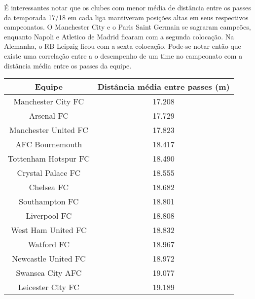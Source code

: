 \documentclass{article}
\begin{document}
É interessantes notar que os clubes com menor média de distância entre os passes da temporada 17/18 em cada liga mantiveram posições altas em seus respectivos campeonatos. O Manchester City e o Paris Saint Germain se sagraram campeões, enquanto Napoli e Atletico de Madrid ficaram com a segunda colocação.
Na Alemanha, o RB Leipzig ficou com a sexta colocação. Pode-se notar então que existe uma correlação entre a o desempenho de um time no campeonato com a distância média entre os passes da equipe.

\begin{table}[H]
    \centering
    \begin{tabular}{|c|c|}
        \hline
        \textbf{Equipe}            & \textbf{Distância média entre passes (m)} \\ \hline
        Manchester City FC         & 17.208                                    \\ \hline
        Arsenal FC                 & 17.729                                    \\ \hline
        Manchester United FC       & 17.823                                    \\ \hline
        AFC Bournemouth            & 18.417                                    \\ \hline
        Tottenham Hotspur FC       & 18.490                                    \\ \hline
        Crystal Palace FC          & 18.555                                    \\ \hline
        Chelsea FC                 & 18.682                                    \\ \hline
        Southampton FC             & 18.801                                    \\ \hline
        Liverpool FC               & 18.808                                    \\ \hline
        West Ham United FC         & 18.832                                    \\ \hline
        Watford FC                 & 18.967                                    \\ \hline
        Newcastle United FC        & 18.972                                    \\ \hline
        Swansea City AFC           & 19.077                                    \\ \hline
        Leicester City FC          & 19.189                                    \\ \hline

\end{tabular}
\end{table}
\end{document}
